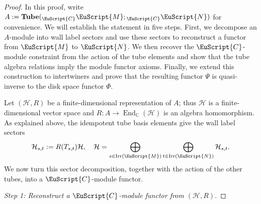 \documentclass[a4paper,11pt]{article}
\theoremstyle{definition}
\theoremstyle{remark}
\newcommand\eC           {\EuScript{C}}
\newcommand\eM          {\EuScript{M}}
\newcommand\eN         {\EuScript{N}}
\newcommand{\Irr}{\operatorname{Irr}}
\newcommand{\End}{\operatorname{End}}
\begin{document}
\begin{proof}
In this proof, write $A:=\mathbf{Tube}({}_{\eC}\eM;{}_{\eC}\eN)$ for convenience. 
We will establish the statement in five steps. First, we decompose an $A$-module into wall label sectors and use these sectors to reconstruct a functor from $\eM$ to $\eN$. 
We then recover the $\eC$-module constraint from the action of the tube elements and show that the tube algebra relations imply the module functor axioms. 
Finally, we extend this construction to intertwiners and prove that the resulting functor $\Psi$ is quasi-inverse to the disk space functor $\Phi$. 

Let $(\mathcal H,R)$ be a finite-dimensional representation of $A$; thus $\mathcal H$ is a finite-dimensional vector space and $R:A\to \End_{\mathbb C}(\mathcal H)$ is an algebra homomorphism.  As explained above, the idempotent tube basis elements give the wall label sectors
\begin{equation}
    \notag
    \mathcal H_{s,t}:=R(T_{s,t})\mathcal H,
    \quad
    \mathcal H
    =
    \bigoplus_{s\in\Irr(\eM)}
    \bigoplus_{t\in\Irr(\eN)}
    \mathcal H_{s,t}.
\end{equation}
We now turn this sector decomposition, together with the action of the other tubes, into a  $\eC$-module functor.  

\smallskip
\textit{Step 1: Reconstruct a  $\eC$-module functor from $(\mathcal H,R)$.}


\end{proof}
\end{document}
